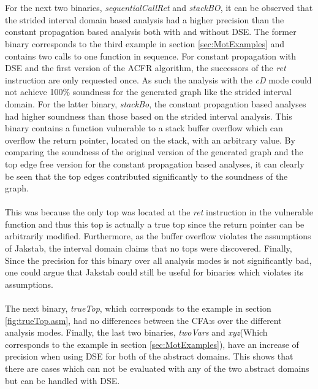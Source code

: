 \documentclass{kththesis}
\renewcommand{\it}[1]{\textit{#1}}
\begin{document}
\\ \\
For the next two binaries, \it{sequentialCallRet} and \it{stackBO}, it can be observed that the strided interval domain based analysis had a higher precision than the constant propagation based analysis both with and without DSE. The former binary corresponds to the third example in section \ref{sec:MotExamples} and contains two calls to one function in sequence. For constant propagation with DSE and the first version of the ACFR algorithm, the successors of the \it{ret} instruction are only requested once. As such the analysis with the \it{cD} mode could not achieve 100\% soundness for the generated graph like the strided interval domain.
\clearpage
\noindent   
For the latter binary, \it{stackBo}, the constant propagation based analyses had higher soundness than those based on the strided interval analysis. This binary contains a function vulnerable to a stack buffer overflow which can overflow the return pointer, located on the stack, with an arbitrary value. By comparing the soundness of the original version of the generated graph and the top edge free version for the constant propagation based analyses, it can clearly be seen that the top edges contributed significantly to the soundness of the graph. 
\\ \\
This was because the only top was located at the \it{ret} instruction in the vulnerable function and thus this top is actually a true top since the return pointer can be arbitrarily modified. Furthermore, as the buffer overflow violates the assumptions of Jakstab, the interval domain claims that no tops were discovered. Finally, Since the precision for this binary over all analysis modes is not significantly bad, one could argue that Jakstab could still be useful for binaries which violates its assumptions.
\\ \\
The next binary, \it{trueTop}, which corresponds to the example in section \ref{fig:trueTop.asm}, had no differences between the CFA:s over the different analysis modes. Finally, the last two binaries, \it{twoVars} and \it{xyz}(Which corresponds to the example in section \ref{sec:MotExamples}), have an increase of precision when using DSE for both of the abstract domains. This shows that there are cases which can not be evaluated with any of the two abstract domains but can be handled with DSE.
\end{document}
